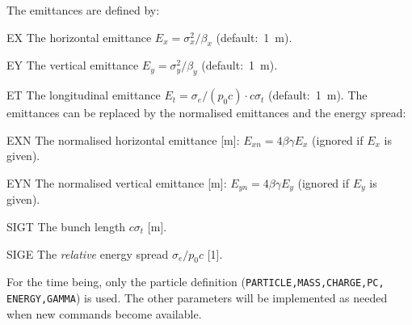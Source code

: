 The emittances are defined by:
\begin{description}
\item{EX}
  The horizontal emittance
  $E_x=\sigma_x^2/\beta_x$
  (default:~1~m).
\item{EY}
  The vertical emittance
  $E_y=\sigma_y^2/\beta_y$
  (default:~1~m).
\item{ET}
  The longitudinal emittance
  $E_t=\sigma_e/(p_0c) \cdot c\sigma_t$
  (default:~1~m).
  The emittances can be replaced
  by the normalised emittances and the energy spread:
\item{EXN}
  The normalised horizontal emittance [m]:
  $E_{xn}=4\beta\gamma E_x$
  (ignored if $E_x$ is given).
\item{EYN}
  The normalised vertical emittance [m]:
  $E_{yn}=4\beta \gamma E_y$
  (ignored if $E_y$ is given).
\item{SIGT}
  The bunch length $c\sigma_t$ [m].
\item{SIGE}
  The {\em relative} energy spread $\sigma_e/p_0 c$ [1].
\end{description}
For the time being, only the particle definition
(\texttt{PARTICLE,MASS,CHARGE,PC,
ENERGY,GAMMA}) is used.
The other parameters will be implemented as needed when new commands
become available.

